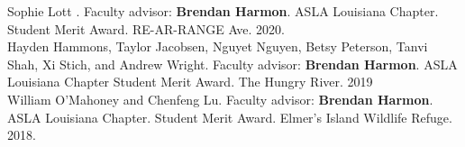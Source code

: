 \documentclass[10pt]{developercv} %
\begin{document}
Sophie Lott	. Faculty advisor: \textbf{Brendan Harmon}. ASLA Louisiana Chapter. Student Merit Award. RE-AR-RANGE Ave. 2020.	\\

Hayden Hammons, Taylor Jacobsen, Nguyet Nguyen, Betsy Peterson, Tanvi Shah, Xi Stich, and Andrew Wright. Faculty advisor: \textbf{Brendan Harmon}. ASLA Louisiana Chapter Student Merit Award. The Hungry River. 2019\\

William O'Mahoney and Chenfeng Lu. Faculty advisor: \textbf{Brendan Harmon}. ASLA Louisiana Chapter. Student Merit Award. Elmer’s Island Wildlife Refuge. 2018.\\


\end{document}
